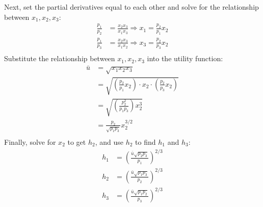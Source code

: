 \documentclass[UTF8,titlepage]{article}
\numberwithin{figure}{section}
\begin{document}
\begin{enumerate}
        Next, set the partial derivatives equal to each other and solve for the relationship between $x_1, x_2, x_3$:
        \begin{align*}
            \frac{p_1}{p_2} &= \frac{x_2 x_3}{x_1 x_3} \Rightarrow x_1 = \frac{p_2}{p_1} x_2 \\
            \frac{p_1}{p_3} &= \frac{x_2 x_3}{x_1 x_2} \Rightarrow x_3 = \frac{p_2}{p_3} x_2 \\
            \end{align*}
        Substitute the relationship between $x_1, x_2, x_3$ into the utility function:
        \begin{align*}
            \bar{u} &= \sqrt{x_1 x_2 x_3} \\
            &= \sqrt{\left(\frac{p_2}{p_1} x_2\right) \cdot x_2 \cdot \left(\frac{p_2}{p_3} x_2\right)} \\
            &= \sqrt{\left(\frac{p_2^2}{p_1 p_3}\right) x_2^3} \\
            &= \frac{p_2}{\sqrt{p_1 p_3}} x_2^{3/2} \\
            \end{align*}
            Finally, solve for $x_2$ to get $h_2$, and use $h_2$ to find $h_1$ and $h_3$:
            \begin{align*}
                h_1 &= \left(\frac{\bar{u} \sqrt{p_2 p_3}}{p_1}\right)^{2/3} \\
                h_2 &= \left(\frac{\bar{u} \sqrt{p_1 p_3}}{p_2}\right)^{2/3} \\
                h_3 &= \left(\frac{\bar{u} \sqrt{p_1 p_2}}{p_3}\right)^{2/3} \\
                \end{align*}
                

\end{enumerate}
\end{document}
